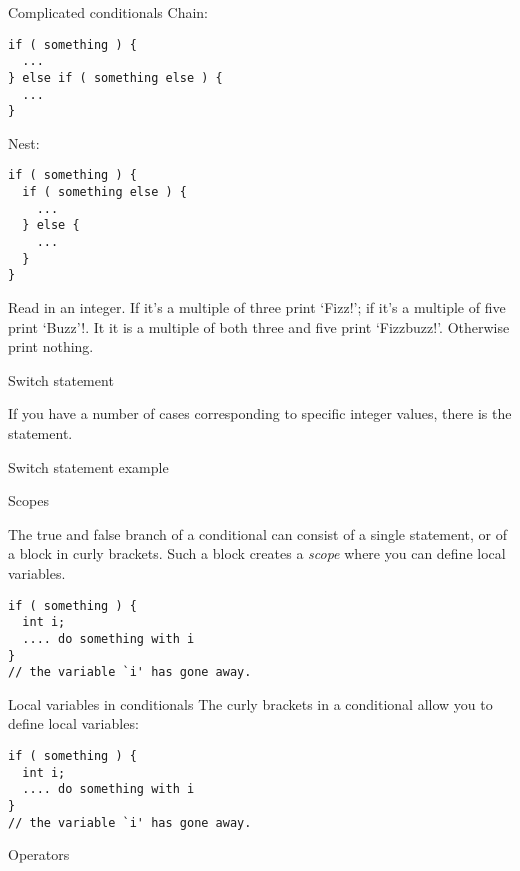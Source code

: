 \begin{slide}{Complicated conditionals}
  \label{sl:elseif}
  Chain:
\begin{verbatim}
if ( something ) {
  ...
} else if ( something else ) {
  ...
}
\end{verbatim}
Nest:
\begin{verbatim}
if ( something ) {
  if ( something else ) {
    ...
  } else {
    ...
  }
}
\end{verbatim}
\end{slide}

\begin{exercise}
  \label{ex:fizzbuzz}
  Read in an integer. If it's a multiple of three print `Fizz!';
  if it's a multiple of five print `Buzz'!. It it is 
  a multiple of both three and five print `Fizzbuzz!'. Otherwise
  print nothing.
\end{exercise}

 {Switch statement}

If you have a number of cases corresponding to specific integer
values, there is the  statement.

\begin{block}{Switch statement example}
\label{sl:switch}
\end{block}

 {Scopes}

The true and false branch of a conditional can consist of a single
statement, or of a block in curly brackets. Such a block creates a
%
\emph{scope}
%
where you can define local variables.

\begin{verbatim}
if ( something ) {
  int i; 
  .... do something with i
}
// the variable `i' has gone away.
\end{verbatim}

\begin{slide}{Local variables in conditionals}
  \label{sl:if-scope}
  The curly brackets in a conditional allow you to define local variables:
\begin{verbatim}
if ( something ) {
  int i; 
  .... do something with i
}
// the variable `i' has gone away.
\end{verbatim}
\end{slide}

 {Operators}

